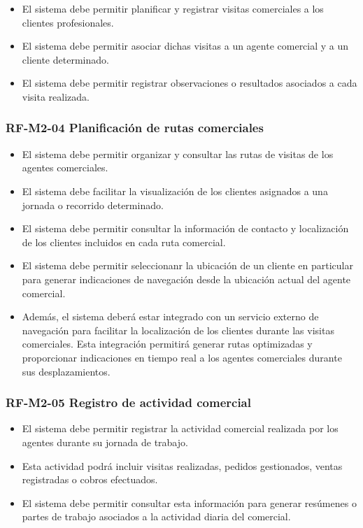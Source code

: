 \begin{itemize}
    \item El sistema debe permitir planificar y registrar visitas comerciales a los clientes profesionales.
    \item El sistema debe permitir asociar dichas visitas a un agente comercial y a un cliente determinado.
    \item El sistema debe permitir registrar observaciones o resultados asociados a cada visita realizada.
\end{itemize}

\vspace{-0.75em}
\subsubsection{RF-M2-04 Planificación de rutas comerciales}
\vspace{-1em}

\begin{itemize}
    \item El sistema debe permitir organizar y consultar las rutas de visitas de los agentes comerciales.
    \item El sistema debe facilitar la visualización de los clientes asignados a una jornada o recorrido determinado.
    \item El sistema debe permitir consultar la información de contacto y localización de los clientes incluidos en cada ruta comercial.
    \item El sistema debe permitir seleccionanr la ubicación de un cliente en particular para generar indicaciones de navegación desde la ubicación actual del agente comercial.
    \item Además, el sistema deberá estar integrado con un servicio externo de navegación para facilitar la localización de los clientes durante las visitas comerciales. Esta integración permitirá generar rutas optimizadas y proporcionar indicaciones en tiempo real a los agentes comerciales durante sus desplazamientos.
\end{itemize}

\vspace{-0.75em}
\subsubsection{RF-M2-05 Registro de actividad comercial}
\vspace{-1em}

\begin{itemize}
    \item El sistema debe permitir registrar la actividad comercial realizada por los agentes durante su jornada de trabajo.
    \item Esta actividad podrá incluir visitas realizadas, pedidos gestionados, ventas registradas o cobros efectuados.
    \item El sistema debe permitir consultar esta información para generar resúmenes o partes de trabajo asociados a la actividad diaria del comercial.
\end{itemize}


